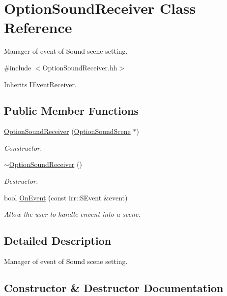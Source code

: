 \hypertarget{classOptionSoundReceiver}{}\section{Option\+Sound\+Receiver Class Reference}
\label{classOptionSoundReceiver}


Manager of event of Sound scene setting.  




{\ttfamily \#include $<$Option\+Sound\+Receiver.\+hh$>$}



Inherits I\+Event\+Receiver.

\subsection*{Public Member Functions}
\begin{DoxyCompactItemize}
\item 
\hyperlink{classOptionSoundReceiver_aac72bf7db0c7610a37f9f14984f087ef}{Option\+Sound\+Receiver} (\hyperlink{classOptionSoundScene}{Option\+Sound\+Scene} $\ast$)
\begin{DoxyCompactList}\small\item\em Constructor. \end{DoxyCompactList}\item 
\hyperlink{classOptionSoundReceiver_aca3553e7a1777ed7e39111325b09954a}{$\sim$\+Option\+Sound\+Receiver} ()
\begin{DoxyCompactList}\small\item\em Destructor. \end{DoxyCompactList}\item 
bool \hyperlink{classOptionSoundReceiver_ae7c9643b12df38a45d4e3d629274019c}{On\+Event} (const irr\+::\+S\+Event \&event)
\begin{DoxyCompactList}\small\item\em Allow the user to handle envent into a scene. \end{DoxyCompactList}\end{DoxyCompactItemize}


\subsection{Detailed Description}
Manager of event of Sound scene setting. 

\subsection{Constructor \& Destructor Documentation}
\mbox{\label{classOptionSoundReceiver_aac72bf7db0c7610a37f9f14984f087ef}} 
